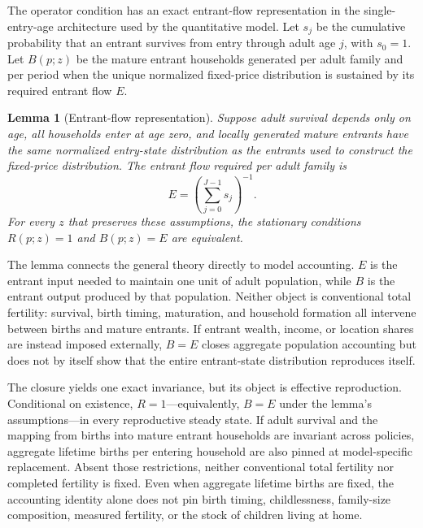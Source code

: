 \documentclass[11pt]{article}
\newtheorem{lemma}{Lemma}
\theoremstyle{definition}
\begin{document}
The operator condition has an exact entrant-flow representation in the
single-entry-age architecture used by the quantitative model. Let $s_j$ be the
cumulative probability that an entrant survives from entry through adult age
$j$, with $s_0=1$. Let $B(p;z)$ be the mature entrant households generated per
adult family and per period when the unique normalized fixed-price distribution
is sustained by its required entrant flow $E$.

\begin{lemma}[Entrant-flow representation]
\label{lem:entrant_flow}
Suppose adult survival depends only on age, all households enter at age zero,
and locally generated mature entrants have the same normalized entry-state
distribution as the entrants used to construct the fixed-price distribution.
The entrant flow required per adult family is
\begin{equation}
 E=\left(\sum_{j=0}^{J-1}s_j\right)^{-1}.
 \label{eq:entrant_requirement}
\end{equation}
For every $z$ that preserves these assumptions, the stationary conditions
$R(p;z)=1$ and $B(p;z)=E$ are equivalent.
\end{lemma}

The lemma connects the general theory directly to model accounting. $E$ is the
entrant input needed to maintain one unit of adult population, while $B$ is the
entrant output produced by that population. Neither object is conventional
total fertility: survival, birth timing, maturation, and household formation
all intervene between births and mature entrants.
If entrant wealth, income, or location shares are instead imposed externally,
$B=E$ closes aggregate population accounting but does not by itself show that
the entire entrant-state distribution reproduces itself.

The closure yields one exact invariance, but its object is effective
reproduction. Conditional on existence, $R=1$---equivalently, $B=E$ under the
lemma's assumptions---in every reproductive steady state. If adult survival and
the mapping from births into mature entrant households are invariant across
policies, aggregate lifetime births per entering household are also pinned at
model-specific replacement. Absent those restrictions, neither conventional
total fertility nor completed fertility is fixed. Even when aggregate lifetime
births are fixed, the accounting identity alone does not pin birth timing,
childlessness, family-size composition, measured fertility, or the stock of
children living at home.
\end{document}
